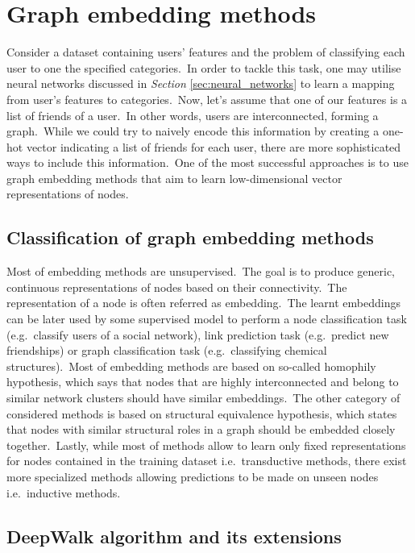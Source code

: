 \documentclass[longabstract, english, mgr]{iithesis}
\theoremstyle{default_theorem_style}\newtheorem{theorem}{Theorem}
\theoremstyle{default_theorem_style}\newtheorem{definition}{Definition}
\begin{document}
\section{Graph embedding methods}\label{sec:graph_embedding_methods}

Consider a dataset containing users' features and the problem of classifying each user to one the specified
categories.\ In order to tackle this task, one may utilise neural networks discussed in
\textit{Section} \ref{sec:neural_networks} to learn a mapping from user's features to categories.\ Now, let's assume
that one of our features is a list of friends of a user.\ In other words, users are interconnected, forming a
graph.\ While we could try to naively encode this information by creating a one-hot vector indicating a list of
friends for each user, there are more sophisticated ways to include this information.\ One of the most successful
approaches is to use graph embedding methods that aim to learn low-dimensional vector representations of nodes.

\subsection{Classification of graph embedding methods}

\noindent Most of embedding methods are unsupervised.\ The goal is to produce generic, continuous representations of
nodes based  on their connectivity.\ The representation of a node is often referred as embedding.\ The learnt
embeddings can be later used by some supervised model to perform a node classification task
(e.g.\ classify users of a social network), link prediction task (e.g.\ predict new friendships) or graph
classification task (e.g.\ classifying chemical structures).\ Most of embedding methods are based on so-called
homophily hypothesis, which says that nodes that are highly interconnected and belong to similar network clusters
should have similar embeddings.\ The other category of considered methods is based on structural equivalence
hypothesis, which states that nodes with similar structural roles in a graph should be embedded closely
together.\ Lastly, while most of methods allow to learn only fixed representations for nodes contained in the training
dataset i.e.\ transductive methods, there exist more specialized methods allowing predictions to be made on unseen
nodes i.e.\ inductive methods.

\subsection{DeepWalk algorithm and its extensions}
\end{document}
